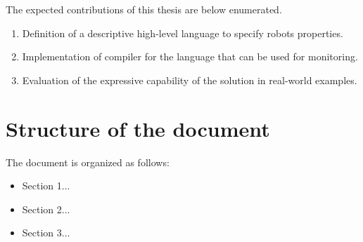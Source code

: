 The expected contributions of this thesis are below enumerated.

\begin{enumerate}
    \item Definition of a descriptive high-level language to specify robots properties.
    \item Implementation of compiler for the language that can be used for monitoring.
    \item Evaluation of the expressive capability of the solution in real-world examples.
\end{enumerate}

\section{Structure of the document}
\label{sec:structure}

The document is organized as follows:

\begin{itemize}
    \item Section 1...
    \item Section 2...
    \item Section 3...
\end{itemize}


